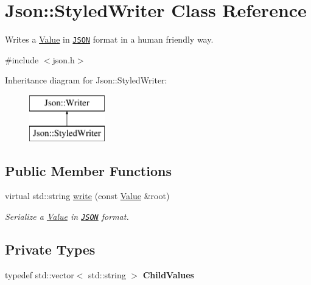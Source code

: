 \hypertarget{class_json_1_1_styled_writer}{\section{Json\-:\-:Styled\-Writer Class Reference}
\label{class_json_1_1_styled_writer}
}


Writes a \hyperlink{class_json_1_1_value}{Value} in \href{http://www.json.org}{\tt J\-S\-O\-N} format in a human friendly way.  




{\ttfamily \#include $<$json.\-h$>$}

Inheritance diagram for Json\-:\-:Styled\-Writer\-:\begin{figure}[H]
\begin{center}
\leavevmode
\includegraphics[height=2.000000cm]{class_json_1_1_styled_writer}
\end{center}
\end{figure}
\subsection*{Public Member Functions}
\begin{DoxyCompactItemize}
\item 
virtual std\-::string \hyperlink{class_json_1_1_styled_writer_a56f0fd80f60272b3f3c85690aae66e7d}{write} (const \hyperlink{class_json_1_1_value}{Value} \&root)
\begin{DoxyCompactList}\small\item\em Serialize a \hyperlink{class_json_1_1_value}{Value} in \href{http://www.json.org}{\tt J\-S\-O\-N} format. \end{DoxyCompactList}\end{DoxyCompactItemize}
\subsection*{Private Types}
\begin{DoxyCompactItemize}
\item 
\hypertarget{class_json_1_1_styled_writer_a0b102abcd4b7e11eb22df63921e097df}{typedef std\-::vector$<$ std\-::string $>$ {\bfseries Child\-Values}}\label{class_json_1_1_styled_writer_a0b102abcd4b7e11eb22df63921e097df}

\end{DoxyCompactItemize}
